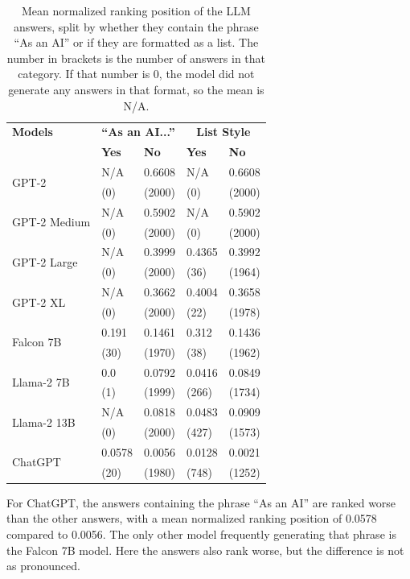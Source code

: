 \begin{table}[tb]
    \centering
    \begin{tabularx}{\textwidth}{lXXXX}
    \hline
    \textbf{Models} & \multicolumn{2}{c}{\textbf{``As an AI...''}} & \multicolumn{2}{c}{\textbf{List Style}} \\
    \cline{2-5} 
    & \textbf{Yes} & \textbf{No} & \textbf{Yes} & \textbf{No} \\
    \hline
    \multirow{2}{*}{GPT-2}        & N/A          & 0.6608  & N/A           & 0.6608  \\
                                  & (0)          & (2000)  & (0)           & (2000) \\
    \multirow{2}{*}{GPT-2 Medium} & N/A          & 0.5902  & N/A           & 0.5902  \\
                                  & (0)          & (2000)  & (0)           & (2000) \\
    \multirow{2}{*}{GPT-2 Large}  & N/A          & 0.3999  & 0.4365        & 0.3992  \\
                                  & (0)          & (2000)  & (36)          & (1964) \\
    \multirow{2}{*}{GPT-2 XL}     & N/A          & 0.3662  & 0.4004        & 0.3658   \\
                                  & (0)          & (2000)  & (22)          & (1978)  \\
    \multirow{2}{*}{Falcon 7B}    & 0.191        & 0.1461  & 0.312         & 0.1436  \\
                                  & (30)         & (1970)  & (38)          & (1962) \\
    \multirow{2}{*}{Llama-2 7B}   & 0.0          & 0.0792  & 0.0416        & 0.0849  \\
                                  & (1)          & (1999)  & (266)         & (1734) \\
    \multirow{2}{*}{Llama-2 13B}  & N/A          & 0.0818  & 0.0483        & 0.0909  \\
                                  & (0)          & (2000)  & (427)         & (1573) \\
    \multirow{2}{*}{ChatGPT}      & 0.0578       & 0.0056  & 0.0128        & 0.0021  \\
                                  & (20)         & (1980)  & (748)         & (1252) \\
    \hline
    \end{tabularx}
    \caption{Mean normalized ranking position of the LLM answers, split by whether they contain the phrase ``As an AI'' or if they are formatted as a list. The number in brackets is the number of answers in that category. If that number is 0, the model did not generate any answers in that format, so the mean is N/A.}
    \label{tab:badly_ranked_answers}
\end{table}
For ChatGPT, the answers containing the phrase ``As an AI'' are ranked worse than the other answers, with a mean normalized ranking position of 0.0578 compared to 0.0056.
The only other model frequently generating that phrase is the Falcon 7B model.
Here the answers also rank worse, but the difference is not as pronounced.

